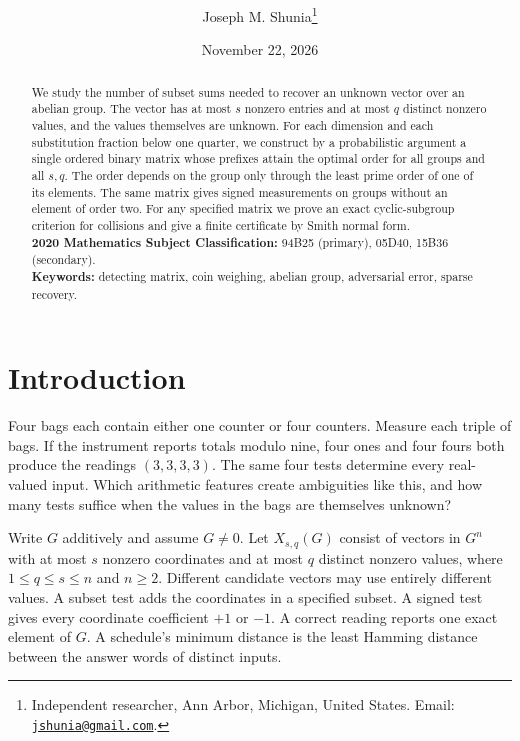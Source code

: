 \documentclass[11pt,letterpaper]{article}
\title{\vspace{-1.5\baselineskip}%
  \manuscripttitle}
\author{Joseph M. Shunia\thanks{Independent researcher, Ann Arbor, Michigan, United States.
  Email: \href{mailto:jshunia@gmail.com}{\texttt{jshunia@gmail.com}}.}}
\date{November 22, 2026}
\newcommand{\manuscriptkeywords}{detecting matrix, coin weighing, abelian group, adversarial error, sparse recovery}
\numberwithin{equation}{section}
\begin{document}
\maketitle
\vspace{-\baselineskip}

\begin{abstract}
We study the number of subset sums needed to recover an unknown vector over an abelian group.
The vector has at most $s$ nonzero entries and at most $q$ distinct nonzero values, and the
values themselves are unknown. For each dimension and each substitution fraction below one
quarter, we construct by a probabilistic argument a single ordered binary matrix whose
prefixes attain the optimal order for all groups and all $s,q$. The order depends on the group
only through the least prime order of one of its elements. The same matrix gives signed measurements on
groups without an element of order two. For any specified matrix we prove an exact
cyclic-subgroup criterion for collisions and give a finite certificate by Smith normal form.
\\[2mm]
{\bf 2020 Mathematics Subject Classification:} 94B25 (primary), 05D40, 15B36 (secondary).
\\[2mm]
{\bf Keywords:} \manuscriptkeywords.
\end{abstract}

\section{Introduction}\label{sec:intro}

Four bags each contain either one counter or four counters. Measure each triple of bags. If
the instrument reports totals modulo nine, four ones and four fours both produce the readings
$(3,3,3,3)$. The same four tests determine every real-valued input. Which arithmetic features
create ambiguities like this, and how many tests suffice when the values in the bags are
themselves unknown?

Write $G$ additively and assume $G\ne 0$. Let $X_{s,q}(G)$ consist of vectors in $G^n$ with at
most $s$ nonzero coordinates and at most $q$ distinct nonzero values, where $1\le q\le s\le n$
and $n\ge2$. Different candidate vectors may use entirely different values. A subset test adds
the coordinates in a specified subset. A signed test gives every coordinate coefficient $+1$
or $-1$. A correct reading reports one exact element of $G$. A schedule's minimum distance is
the least Hamming distance between the answer words of distinct inputs.
\end{document}
